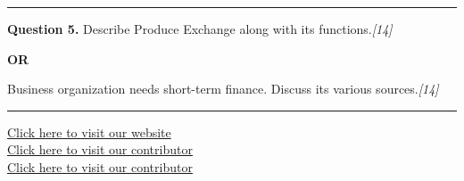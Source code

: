 \documentclass[11pt,a4paper]{article}
\newcommand{\pts}[1]{\hfill   \textit{[#1]}}
\begin{document}
\medskip\rule{\linewidth}{0.2pt}




\noindent   \textbf{Question 5.}
Describe Produce Exchange along with its functions.\pts{14}

\centerline{   \textbf{OR}}

Business organization needs short-term finance. Discuss its various sources.\pts{14}

\vfill
\rule{\linewidth}{0.4pt}

\begin{center}\small
\href{https://bhu-exam.vercel.app/}{Click here to visit our website}\\[4pt]
\href{https://me-aryan.vercel.app/}{Click here to visit our contributor}\\[4pt]
\href{https://quashan-me.vercel.app/}{Click here to visit our contributor}
\end{center}
\end{document}
